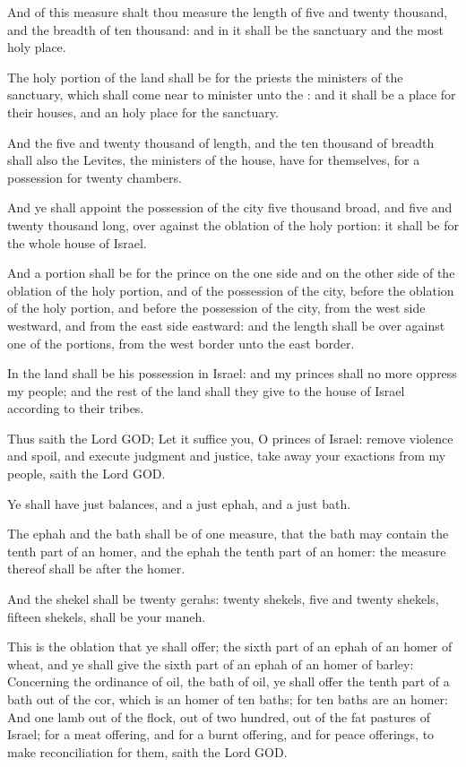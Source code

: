 \Verse And of this measure shalt thou measure the length of five and twenty thousand, and the breadth of ten thousand: and in it shall be the sanctuary and the most holy place.

\Verse The holy portion of the land shall be for the priests the ministers of the sanctuary, which shall come near to minister unto the \LORD: and it shall be a place for their houses, and an holy place for the sanctuary.

\Verse And the five and twenty thousand of length, and the ten thousand of breadth shall also the Levites, the ministers of the house, have for themselves, for a possession for twenty chambers.

\Verse And ye shall appoint the possession of the city five thousand broad, and five and twenty thousand long, over against the oblation of the holy portion: it shall be for the whole house of Israel.

\Verse And a portion shall be for the prince on the one side and on the other side of the oblation of the holy portion, and of the possession of the city, before the oblation of the holy portion, and before the possession of the city, from the west side westward, and from the east side eastward: and the length shall be over against one of the portions, from the west border unto the east border.

\Verse In the land shall be his possession in Israel: and my princes shall no more oppress my people; and the rest of the land shall they give to the house of Israel according to their tribes.

\Verse Thus saith the Lord GOD; Let it suffice you, O princes of Israel: remove violence and spoil, and execute judgment and justice, take away your exactions from my people, saith the Lord GOD.

\Verse Ye shall have just balances, and a just ephah, and a just bath.

\Verse The ephah and the bath shall be of one measure, that the bath may contain the tenth part of an homer, and the ephah the tenth part of an homer: the measure thereof shall be after the homer.

\Verse And the shekel shall be twenty gerahs: twenty shekels, five and twenty shekels, fifteen shekels, shall be your maneh.

\Verse This is the oblation that ye shall offer; the sixth part of an ephah of an homer of wheat, and ye shall give the sixth part of an ephah of an homer of barley: \Verse Concerning the ordinance of oil, the bath of oil, ye shall offer the tenth part of a bath out of the cor, which is an homer of ten baths; for ten baths are an homer: \Verse And one lamb out of the flock, out of two hundred, out of the fat pastures of Israel; for a meat offering, and for a burnt offering, and for peace offerings, to make reconciliation for them, saith the Lord GOD.

